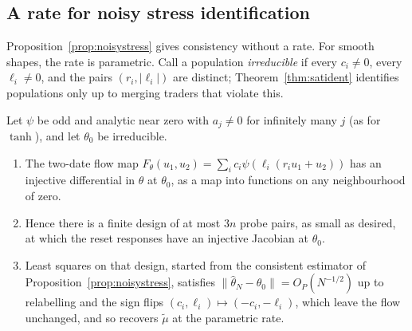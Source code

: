 \subsection{A rate for noisy stress identification}

Proposition~\ref{prop:noisystress} gives consistency without a rate. For smooth shapes, the rate is parametric. Call a population \emph{irreducible} if every $c_i\ne0$, every $\ell_i\ne0$, and the pairs $(r_i,|\ell_i|)$ are distinct; Theorem~\ref{thm:satident} identifies populations only up to merging traders that violate this.

\begin{proposition}\label{prop:stressrate}
Let $\psi$ be odd and analytic near zero with $a_j\ne0$ for infinitely many $j$ (as for $\tanh$), and let $\theta_0$ be irreducible.
\begin{enumerate}[label=(\roman*),itemsep=1pt]
\item The two-date flow map $F_\theta(u_1,u_2)=\sum_ic_i\psi(\ell_i(r_iu_1+u_2))$ has an injective differential in $\theta$ at $\theta_0$, as a map into functions on any neighbourhood of zero.
\item Hence there is a finite design of at most $3n$ probe pairs, as small as desired, at which the reset responses have an injective Jacobian at $\theta_0$.
\item Least squares on that design, started from the consistent estimator of Proposition~\ref{prop:noisystress}, satisfies $\|\hat\theta_N-\theta_0\|=O_P(N^{-1/2})$ up to relabelling and the sign flips $(c_i,\ell_i)\mapsto(-c_i,-\ell_i)$, which leave the flow unchanged, and so recovers $\tilde\mu$ at the parametric rate.
\end{enumerate}
\end{proposition}

